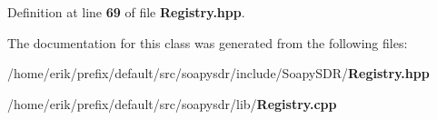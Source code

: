 Definition at line {\bf 69} of file {\bf Registry.\+hpp}.



The documentation for this class was generated from the following files\+:\begin{DoxyCompactItemize}
\item 
/home/erik/prefix/default/src/soapysdr/include/\+Soapy\+S\+D\+R/{\bf Registry.\+hpp}\item 
/home/erik/prefix/default/src/soapysdr/lib/{\bf Registry.\+cpp}\end{DoxyCompactItemize}
